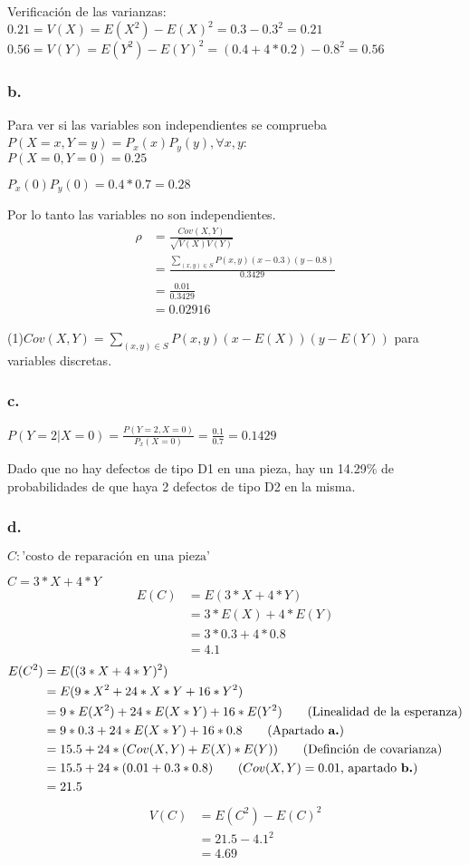 \documentclass[12pt,fleqn]{article}
\begin{document}
Verificación de las varianzas:\\

$0.21=V(X)=E(X^2)-E(X)^2=0.3-0.3^2=0.21$\\

$0.56=V(Y)=E(Y^2)-E(Y)^2=(0.4+4*0.2)-0.8^2=0.56$
\newpage
\subsubsection*{b.}
Para ver si las variables son independientes se comprueba $P(X=x,Y=y)=P_x(x)P_y(y),\forall x,y$:\\

$P(X=0,Y=0)=0.25$

$P_x(0)P_y(0)=0.4*0.7=0.28$

Por lo tanto las variables no son independientes.\\
\begin{align*}
  \rho&=\frac{Cov(X,Y)}{\sqrt{V(X)V(Y)}}\\
      &=\frac{\sum_{(x,y)\in S}P(x,y)(x-0.3)(y-0.8)}{0.3429}\tag{1}\\
      &=\frac{0.01}{0.3429}\\
      &=0.02916
\end{align*}

(1)$Cov(X,Y)=\sum_{(x,y)\in S}P(x,y)(x-E(X))(y-E(Y))$ para variables discretas.
\subsubsection*{c.}
$P(Y=2|X=0)=\frac{P(Y=2,X=0)}{P_x(X=0)}=\frac{0.1}{0.7}=0.1429$

Dado que no hay defectos de tipo D1 en una pieza, hay un 14.29\% de probabilidades de que haya 2 defectos de tipo D2 en la misma.
\subsubsection*{d.}
$C: \textrm{'costo de reparación en una pieza'}$

$C=3*X+4*Y$
\begin{align*}
  E(C)&=E(3*X+4*Y)\\
      &=3*E(X)+4*E(Y)\tag{Esperanza de combinación lineal}\\
      &=3*0.3+4*0.8\\
      &=4.1
\end{align*}
\begin{align*}
  E(C^2)&=E((3*X+4*Y)^2)\\
        &=E(9*X^2+24*X*Y+16*Y^2)\\
        &=9*E(X^2)+24*E(X*Y)+16*E(Y^2)\tag{Linealidad de la esperanza}\\
        &=9*0.3+24*E(X*Y)+16*0.8\tag{Apartado \textbf{a.}}\\
        &=15.5+24*(Cov(X,Y)+E(X)*E(Y))\tag{Definción de covarianza}\\
        &=15.5+24*(0.01+0.3*0.8)\tag{$Cov(X,Y)=0.01$, apartado \textbf{b.}}\\
        &=21.5
\end{align*}
\begin{align*}
  V(C)&=E(C^2)-E(C)^2\\
      &=21.5-4.1^2\\
      &=4.69
\end{align*}
\end{document}
